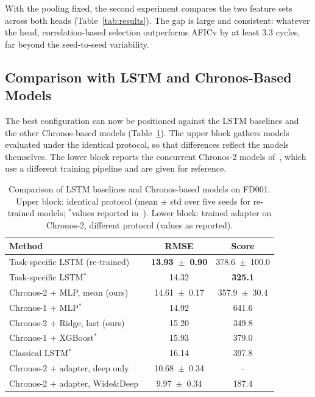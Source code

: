 \documentclass{svproc}
\begin{document}
With the pooling fixed, the second experiment compares the two feature
sets across both heads (Table~\ref{tab:results}). The gap is large and
consistent: whatever the head, correlation-based selection outperforms
AFICv by at least 3.3 cycles, far beyond the seed-to-seed variability.

\subsection{Comparison with LSTM and Chronos-Based Models}

The best configuration can now be positioned against the LSTM baselines
and the other Chronos-based models (Table~\ref{tab:baselines}). The upper
block gathers models evaluated under the identical protocol, so that
differences reflect the models themselves. The lower block reports the
concurrent Chronos-2 models of~\cite{abdouni2026}, which use a different
training pipeline and are given for reference.

\begin{table}[t]
\caption{Comparison of LSTM baselines and Chronos-based models on FD001.
Upper block: identical protocol (mean $\pm$ std over five seeds for
re-trained models; $^\ast$values reported in~\cite{imsa2025}). Lower block: trained adapter on Chronos-2,
different protocol (values as reported).}
\label{tab:baselines}
\centering
\begin{tabular}{lcc}
\toprule
\textbf{Method} & \textbf{RMSE} & \textbf{Score} \\
\midrule
Task-specific LSTM (re-trained)         & \textbf{13.93~$\pm$~0.90} & 378.6~$\pm$~100.0 \\
Task-specific LSTM$^\ast$               & 14.32 & \textbf{325.1} \\
Chronos-2 + MLP, mean (ours)            & 14.61~$\pm$~0.17 & 357.9~$\pm$~30.4 \\
Chronos-1 + MLP$^\ast$                  & 14.92 & 641.6 \\
Chronos-2 + Ridge, last (ours)          & 15.20 & 349.8 \\
Chronos-1 + XGBoost$^\ast$              & 15.93 & 379.0 \\
Classical LSTM$^\ast$                   & 16.14 & 397.8 \\
\midrule
Chronos-2 + adapter, deep only~\cite{abdouni2026}  & 10.68~$\pm$~0.34 & -- \\
Chronos-2 + adapter, Wide\&Deep~\cite{abdouni2026} & 9.97~$\pm$~0.34 & 187.4 \\
\bottomrule
\end{tabular}
\end{table}
\end{document}
